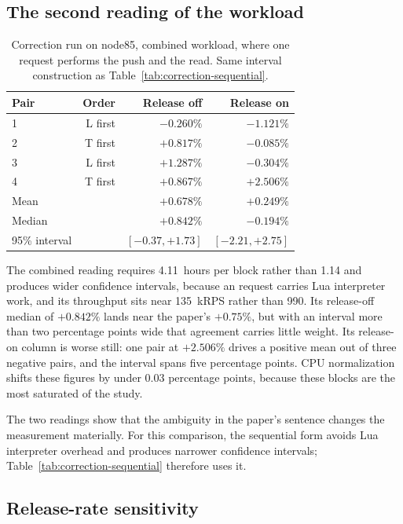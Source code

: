 \documentclass[sigconf]{acmart}
\DeclareRobustCommand{\code}[1]{\path{#1}}
\begin{document}
\subsection{The second reading of the workload}

\begin{table}[ht]
\caption{Correction run on node85, combined \code{EVAL} workload, where one
request performs the push and the read. Same interval construction as
Table~\ref{tab:correction-sequential}.}
\label{tab:correction-combined}
\footnotesize
\begin{tabular}{@{}lrrr@{}}
\toprule
Pair & Order & Release off & Release on \\
\midrule
1 & L first & $-0.260\%$ & $-1.121\%$ \\
2 & T first & $+0.817\%$ & $-0.085\%$ \\
3 & L first & $+1.287\%$ & $-0.304\%$ \\
4 & T first & $+0.867\%$ & $+2.506\%$ \\
\midrule
Mean          & & $+0.678\%$ & $+0.249\%$ \\
Median        & & $+0.842\%$ & $-0.194\%$ \\
95\% interval & & $[-0.37,+1.73]$ & $[-2.21,+2.75]$ \\
\bottomrule
\end{tabular}
\end{table}

The combined reading requires 4.11~hours per block rather than 1.14 and produces
wider confidence intervals, because an \code{EVAL} request carries
Lua interpreter work, and its throughput sits near 135~kRPS rather than 990. Its release-off median of $+0.842\%$ lands
near the paper's $+0.75\%$, but with an interval more than two percentage points
wide that agreement carries little weight. Its release-on column is worse still:
one pair at $+2.506\%$ drives a positive mean out of three negative pairs, and
the interval spans five percentage points. CPU normalization shifts these figures by under $0.03$ percentage points,
because these blocks are the most saturated of the study.

The two readings show that the ambiguity in the paper's sentence changes the
measurement materially. For this comparison, the sequential form avoids Lua
interpreter overhead and produces narrower confidence intervals;
Table~\ref{tab:correction-sequential} therefore uses it.

\subsection{Release-rate sensitivity}
\label{sec:sensitivity}
\end{document}

